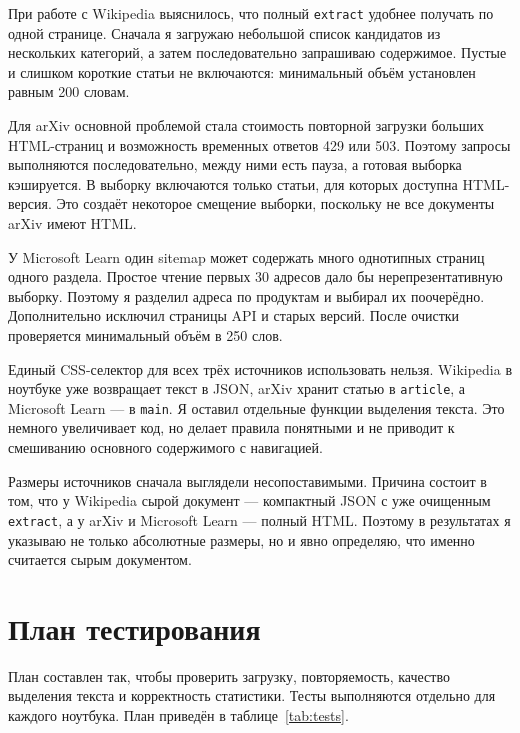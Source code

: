\documentclass[pdf,unicode,12pt,a4paper,oneside,fleqn]{article}
\begin{document}
При работе с Wikipedia выяснилось, что полный \texttt{extract} удобнее получать
по одной странице. Сначала я загружаю небольшой список кандидатов из нескольких
категорий, а затем последовательно запрашиваю содержимое. Пустые и слишком
короткие статьи не включаются: минимальный объём установлен равным 200 словам.

Для arXiv основной проблемой стала стоимость повторной загрузки больших
HTML-страниц и возможность временных ответов 429 или 503. Поэтому запросы
выполняются последовательно, между ними есть пауза, а готовая выборка кэшируется.
В выборку включаются только статьи, для которых доступна HTML-версия. Это создаёт
некоторое смещение выборки, поскольку не все документы arXiv имеют HTML.

У Microsoft Learn один sitemap может содержать много однотипных страниц одного
раздела. Простое чтение первых 30 адресов дало бы нерепрезентативную выборку.
Поэтому я разделил адреса по продуктам и выбирал их поочерёдно. Дополнительно
исключил страницы API и старых версий. После очистки проверяется минимальный объём
в 250 слов.

Единый CSS-селектор для всех трёх источников использовать нельзя. Wikipedia в
ноутбуке уже возвращает текст в JSON, arXiv хранит статью в \texttt{article}, а
Microsoft Learn --- в \texttt{main}. Я оставил отдельные функции выделения
текста. Это немного увеличивает код, но делает правила понятными и не приводит к
смешиванию основного содержимого с навигацией.

Размеры источников сначала выглядели несопоставимыми. Причина состоит в том, что
у Wikipedia сырой документ --- компактный JSON с уже очищенным
\texttt{extract}, а у arXiv и Microsoft Learn --- полный HTML. Поэтому в
результатах я указываю не только абсолютные размеры, но и явно определяю, что
именно считается сырым документом.

\section{План тестирования}

План составлен так, чтобы проверить загрузку, повторяемость, качество выделения
текста и корректность статистики. Тесты выполняются отдельно для каждого
ноутбука. План приведён в таблице~\ref{tab:tests}.
\end{document}

